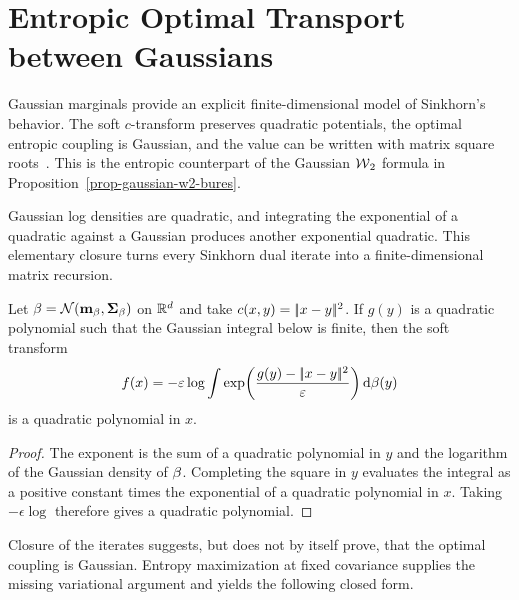 \section{Entropic Optimal Transport between Gaussians}
\label{sec-gaussian-sinkhorn}

Gaussian marginals provide an explicit finite-dimensional model of Sinkhorn's behavior. The soft $c$-transform preserves quadratic potentials, the optimal entropic coupling is Gaussian, and the value can be written with matrix square roots~\cite{janati2020gaussian}. This is the entropic counterpart of the Gaussian $\operatorname{\mathcal{W}}_2$ formula in Proposition~\ref{prop-gaussian-w2-bures}.

Gaussian log densities are quadratic, and integrating the exponential of a quadratic against a Gaussian produces another exponential quadratic. This elementary closure turns every Sinkhorn dual iterate into a finite-dimensional matrix recursion.

\begin{prop}\label{prop-gaussian-sinkhorn-closure}
	Let $\beta=\mathcal{N}(\mathbf{m}_\beta,\mathbf{\Sigma}_\beta)$ on $\mathbb{R}^d$ and take $c(x,y)=|\!| x-y |\!|^2$. If $g(y)$ is a quadratic polynomial such that the Gaussian integral below is finite, then the soft transform
	\[
		f(x)
		=
		-\varepsilon\log
		\int
		\exp\!\left(\frac{g(y)-|\!| x-y |\!|^2}{\varepsilon}\right)
		\mathrm{d}\beta(y)
	\]
	is a quadratic polynomial in $x$.
\end{prop}

\begin{proof}
	The exponent is the sum of a quadratic polynomial in $y$ and the logarithm of the Gaussian density of $\beta$. Completing the square in $y$ evaluates the integral as a positive constant times the exponential of a quadratic polynomial in $x$. Taking $-\epsilon\log$ therefore gives a quadratic polynomial.
\end{proof}

Closure of the iterates suggests, but does not by itself prove, that the optimal coupling is Gaussian. Entropy maximization at fixed covariance supplies the missing variational argument and yields the following closed form.

